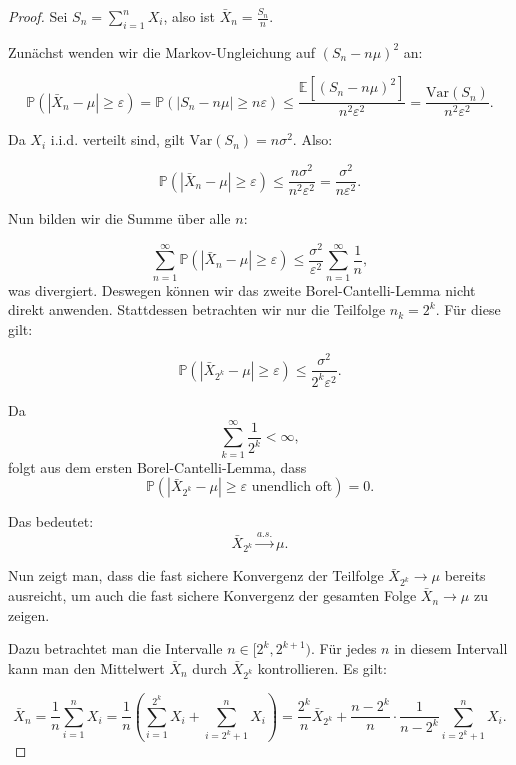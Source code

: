\documentclass[aodsor,preprint]{imsart}
\numberwithin{equation}{section}
\theoremstyle{plain}
\begin{document}
\begin{proof}
Sei \( S_n = \sum_{i=1}^n X_i \), also ist \( \bar{X}_n = \frac{S_n}{n} \).

Zunächst wenden wir die Markov-Ungleichung auf \( (S_n - n\mu)^2 \) an:

\[
\mathbb{P}\left( \left| \bar{X}_n - \mu \right| \geq \varepsilon \right)
= \mathbb{P}\left( \left| S_n - n\mu \right| \geq n\varepsilon \right)
\leq \frac{\mathbb{E}[(S_n - n\mu)^2]}{n^2 \varepsilon^2}
= \frac{\text{Var}(S_n)}{n^2 \varepsilon^2}.
\]

Da \( X_i \) i.i.d. verteilt sind, gilt \( \text{Var}(S_n) = n \sigma^2 \). Also:

\[
\mathbb{P}\left( \left| \bar{X}_n - \mu \right| \geq \varepsilon \right)
\leq \frac{n \sigma^2}{n^2 \varepsilon^2}
= \frac{\sigma^2}{n \varepsilon^2}.
\]

Nun bilden wir die Summe über alle \( n \):

\[
\sum_{n=1}^\infty \mathbb{P}\left( \left| \bar{X}_n - \mu \right| \geq \varepsilon \right)
\leq \frac{\sigma^2}{\varepsilon^2} \sum_{n=1}^\infty \frac{1}{n},
\]
was divergiert. Deswegen können wir das zweite Borel-Cantelli-Lemma nicht direkt anwenden.
Stattdessen betrachten wir nur die Teilfolge \( n_k = 2^k \). Für diese gilt:

\[
\mathbb{P}\left( \left| \bar{X}_{2^k} - \mu \right| \geq \varepsilon \right)
\leq \frac{\sigma^2}{2^k \varepsilon^2}.
\]

Da
\[
\sum_{k=1}^\infty \frac{1}{2^k} < \infty,
\]
folgt aus dem ersten Borel-Cantelli-Lemma, dass
\[
\mathbb{P}\left( \left| \bar{X}_{2^k} - \mu \right| \geq \varepsilon \text{ unendlich oft} \right) = 0.
\]

Das bedeutet:
\[
\bar{X}_{2^k} \xrightarrow{a.s.} \mu.
\]

Nun zeigt man, dass die fast sichere Konvergenz der Teilfolge \( \bar{X}_{2^k} \to \mu \) bereits ausreicht, um auch die fast sichere Konvergenz der gesamten Folge \( \bar{X}_n \to \mu \) zu zeigen.

Dazu betrachtet man die Intervalle \( n \in [2^k, 2^{k+1}) \). Für jedes \( n \) in diesem Intervall kann man den Mittelwert \( \bar{X}_n \) durch \( \bar{X}_{2^k} \) kontrollieren. Es gilt:

\[
\bar{X}_n = \frac{1}{n} \sum_{i=1}^n X_i 
= \frac{1}{n} \left( \sum_{i=1}^{2^k} X_i + \sum_{i=2^k + 1}^n X_i \right)
= \frac{2^k}{n} \bar{X}_{2^k} + \frac{n - 2^k}{n} \cdot \frac{1}{n - 2^k} \sum_{i=2^k + 1}^n X_i.
\]


\end{proof}
\end{document}
